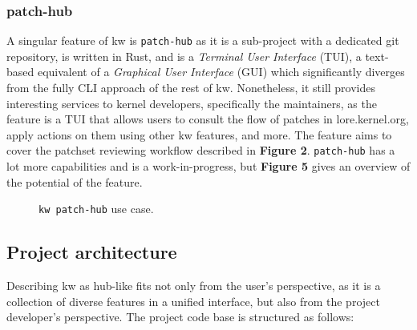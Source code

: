 \subsubsection{patch-hub}

A singular feature of kw is \texttt{patch-hub} as it is a sub-project with a
dedicated git repository, is written in Rust, and is a \textit{Terminal User
Interface} (TUI), a text-based equivalent of a \textit{Graphical User Interface}
(GUI) which significantly diverges from the fully CLI approach of the rest of
kw. Nonetheless, it still provides interesting services to kernel developers,
specifically the maintainers, as the feature is a TUI that allows users to
consult the flow of patches in lore.kernel.org, apply actions on them using
other kw features, and more. The feature aims to cover the patchset reviewing
workflow described in \textbf{Figure 2}. \texttt{patch-hub} has a lot more
capabilities and is a work-in-progress, but \textbf{Figure 5} gives an overview
of the potential of the feature.

\begin{figure}[htbp]
    \centering
    \caption{\texttt{kw patch-hub} use case.}
    \label{fig:patchset-dev-workflow}
\end{figure}

\subsection{Project architecture}

Describing kw as hub-like fits not only from the user's perspective, as it is a
collection of diverse features in a unified interface, but also from the project
developer's perspective. The project code base is structured as follows:

